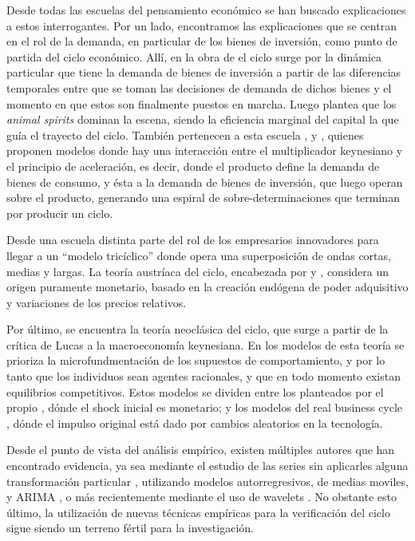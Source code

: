 \documentclass[a4paper]{article}
\begin{document}
Desde todas las escuelas del pensamiento económico se han buscado explicaciones a estos interrogantes. Por un lado, encontramos las explicaciones que se centran en el rol de la demanda, en particular de los bienes de inversión, como punto de partida del ciclo económico. Allí, en la obra de \cite{kalecki2013essays} el ciclo surge por la dinámica particular que tiene la demanda de bienes de inversión a partir de las diferencias temporales entre que se toman las decisiones de demanda de dichos bienes y el momento en que estos son finalmente puestos en marcha. Luego \cite{keynes2018general} plantea que los \textit{animal spirits} dominan la escena, siendo la eficiencia marginal del capital la que guía el trayecto del ciclo. También pertenecen a esta escuela \cite{harrod1936trade}, \cite{kaldor1940model} y \cite{samuelson1939synthesis}, quienes proponen modelos donde hay una interacción entre el multiplicador keynesiano y el principio de aceleración, es decir, donde el producto define la demanda de bienes de consumo, y ésta a la demanda de bienes de inversión, que luego operan sobre el producto, generando una espiral de sobre-determinaciones que terminan por producir un ciclo. 

Desde una escuela distinta \cite{schumpeter1939business} parte del rol de los empresarios innovadores para llegar a un “modelo tricíclico” donde opera una superposición de ondas cortas, medias y largas. 
La teoría austríaca del ciclo, encabezada por \cite{hayek1933} y \cite{von1943elastic}, considera un origen puramente monetario, basado en la creación endógena de poder adquisitivo y variaciones de los precios relativos. 

Por último, se encuentra la teoría neoclásica del ciclo, que surge a partir de la crítica de Lucas a la macroeconomía keynesiana. En los modelos de esta teoría se prioriza la microfundmentación de los supuestos de comportamiento, y por lo tanto que los individuos sean agentes racionales, y que en todo momento existan equilibrios competitivos. Estos modelos se dividen entre los planteados por el propio \cite{lucas1975equilibrium}, dónde el shock inicial es monetario; y los modelos del real business cycle \citep{plosser1989understanding}, dónde el impulso original está dado por cambios aleatorios en la tecnología.

Desde el punto de vista del análisis empírico, existen múltiples autores que han encontrado evidencia, ya sea mediante el estudio de las series sin aplicarles alguna transformación particular \citep{kuznets1930secular,kondratieff1979long,schumpeter1939business}, utilizando  modelos autorregresivos, de medias moviles, y ARIMA \citep{hamilton1989new,kaiser2012measuring}, o más recientemente mediante el uso de wavelets \citep{yogo2008measuring,soares2011business}. No obstante esto último, la utilización de nuevas técnicas empíricas para la verificación del ciclo sigue siendo un terreno fértil para la investigación.
\end{document}
